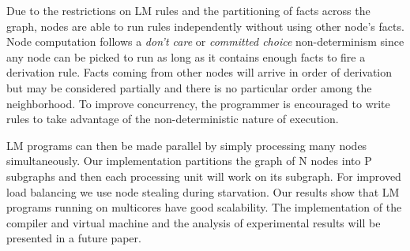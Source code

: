 Due to the restrictions on LM rules and the partitioning of facts across the graph, nodes are able to
run rules independently without using other node's facts. Node computation follows a \emph{don't care} or \emph{committed choice} non-determinism
since any node can be picked to run as long as it contains enough facts to fire a derivation rule.
Facts coming from other nodes will arrive in order of derivation but may be considered
partially and there is no particular order among the neighborhood. To improve concurrency,
the programmer is encouraged to write rules to take advantage of the non-deterministic nature of execution.

LM programs can then be made parallel by simply processing many nodes simultaneously.
Our implementation partitions the graph of N nodes into P subgraphs and then each processing unit will work on its subgraph.
For improved load balancing we use node stealing during starvation.
Our results show that LM programs running on multicores have good scalability.
The implementation of the compiler and virtual machine and
the analysis of experimental results will be presented in a future paper.